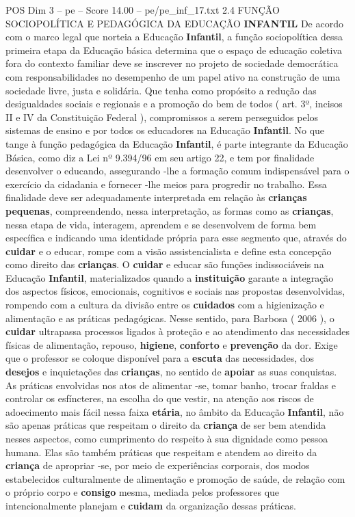 \begin{textsample}{POS Dim 3 – pe – Score 14.00 – pe/pe\_inf\_17.txt}  \label{ex:f3_pos_279}
2.4 FUNÇÃO SOCIOPOLÍTICA E PEDAGÓGICA DA EDUCAÇÃO \textbf{INFANTIL} De acordo com o marco legal que norteia a Educação \textbf{Infantil}, a função sociopolítica dessa primeira etapa da Educação básica determina que o espaço de educação coletiva fora do contexto familiar deve se inscrever no projeto de sociedade democrática com responsabilidades no desempenho de um papel ativo na construção de uma sociedade livre, justa e solidária.
Que tenha como propósito a redução das desigualdades sociais e regionais e a promoção do bem de todos ( art. 3º, incisos II e IV da Constituição Federal ), compromissos a serem perseguidos pelos sistemas de ensino e por todos os educadores na Educação \textbf{Infantil}.
No que tange à função pedagógica da Educação \textbf{Infantil}, é parte integrante da Educação Básica, como diz a Lei nº 9.394/96 em seu artigo 22, e tem por finalidade desenvolver o educando, assegurando -lhe a formação comum indispensável para o exercício da cidadania e fornecer -lhe meios para progredir no trabalho.
Essa finalidade deve ser adequadamente interpretada em relação às \textbf{crianças} \textbf{pequenas}, compreendendo, nessa interpretação, as formas como as \textbf{crianças}, nessa etapa de vida, interagem, aprendem e se desenvolvem de forma bem específica e indicando uma identidade própria para esse segmento que, através do \textbf{cuidar} e o educar, rompe com a visão assistencialista e define esta concepção como direito das \textbf{crianças}.
O \textbf{cuidar} e educar são funções indissociáveis na Educação \textbf{Infantil}, materializados quando a \textbf{instituição} garante a integração dos aspectos físicos, emocionais, cognitivos e sociais nas propostas desenvolvidas, rompendo com a cultura da divisão entre os \textbf{cuidados} com a higienização e alimentação e as práticas pedagógicas.
Nesse sentido, para Barbosa ( 2006 ), o \textbf{cuidar} ultrapassa processos ligados à proteção e ao atendimento das necessidades físicas de alimentação, repouso, \textbf{higiene}, \textbf{conforto} e \textbf{prevenção} da dor.
Exige que o professor se coloque disponível para a \textbf{escuta} das necessidades, dos \textbf{desejos} e inquietações das \textbf{crianças}, no sentido de \textbf{apoiar} as suas conquistas.
As práticas envolvidas nos atos de alimentar -se, tomar banho, trocar fraldas e controlar os esfíncteres, na escolha do que vestir, na atenção aos riscos de adoecimento mais fácil nessa faixa \textbf{etária}, no âmbito da Educação \textbf{Infantil}, não são apenas práticas que respeitam o direito da \textbf{criança} de ser bem atendida nesses aspectos, como cumprimento do respeito à sua dignidade como pessoa humana.
Elas são também práticas que respeitam e atendem ao direito da \textbf{criança} de apropriar -se, por meio de experiências corporais, dos modos estabelecidos culturalmente de alimentação e promoção de saúde, de relação com o próprio corpo e \textbf{consigo} mesma, mediada pelos professores que intencionalmente planejam e \textbf{cuidam} da organização dessas práticas.

\end{textsample}
